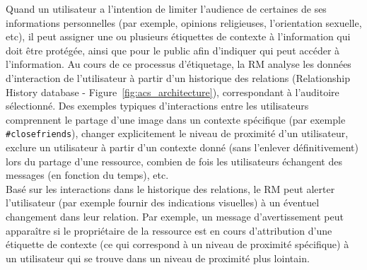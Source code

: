 \documentclass[a4paper]{article}
\begin{document}
Quand un utilisateur a l'intention de limiter l'audience de certaines de ses informations personnelles (par exemple, opinions religieuses, l'orientation sexuelle, etc), il peut assigner une ou plusieurs étiquettes de contexte à l'information qui doit être protégée, ainsi que pour le public afin d'indiquer qui peut accéder à l'information. Au cours de ce processus d'étiquetage, la RM analyse les données d'interaction de l'utilisateur à partir d'un historique des relations (Relationship History database - Figure~\ref{fig:acs_architecture}), correspondant à l'auditoire sélectionné. Des exemples typiques d'interactions entre les utilisateurs comprennent le partage d'une image dans un contexte spécifique (par exemple \verb+#closefriends+), changer explicitement le niveau de proximité d'un utilisateur, exclure un utilisateur à partir d'un contexte donné (sans l'enlever définitivement) lors du partage d'une ressource, combien de fois les utilisateurs échangent des messages (en fonction du temps), etc.\\


Basé sur les interactions dans le historique des relations, le RM peut alerter l'utilisateur (par exemple fournir des indications visuelles) à un éventuel changement dans leur relation. Par exemple, un message d'avertissement peut apparaître si le propriétaire de la ressource est en cours d'attribution d'une étiquette de contexte (ce qui correspond à un niveau de proximité spécifique) à un utilisateur qui se trouve dans un niveau de proximité plus lointain.\\
\end{document}
